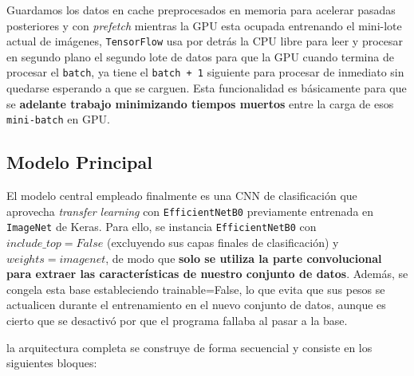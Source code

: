 Guardamos los datos en cache preprocesados en memoria para acelerar pasadas posteriores y con \textit{prefetch} mientras la GPU esta ocupada entrenando el mini-lote actual de imágenes, \texttt{TensorFlow} usa por detrás la CPU libre para leer y procesar en segundo plano el segundo lote de datos para que la GPU cuando termina de procesar el \texttt{batch}, ya tiene el \texttt{batch + 1} siguiente para procesar de inmediato sin quedarse esperando a que se carguen. Esta funcionalidad es básicamente para que se \textbf{adelante trabajo minimizando tiempos muertos} entre la carga de esos \texttt{mini-batch} en GPU.

\subsection{Modelo Principal}
El modelo central empleado finalmente es una CNN de clasificación que aprovecha \textit{transfer learning} con \texttt{EfficientNetB0} previamente entrenada en \texttt{ImageNet} de Keras. Para ello, se instancia \texttt{EfficientNetB0} con $include\_top=False$ (excluyendo sus capas finales de clasificación) y $weights=imagenet$, de modo que \textbf{solo se utiliza la parte convolucional para extraer las características de nuestro conjunto de datos}. Además, se congela esta base estableciendo trainable=False, lo que evita que sus pesos se actualicen durante el entrenamiento en el nuevo conjunto de datos, aunque es cierto que se desactivó por que el programa fallaba al pasar a la base.

la arquitectura completa se construye de forma secuencial y consiste en los siguientes bloques:


